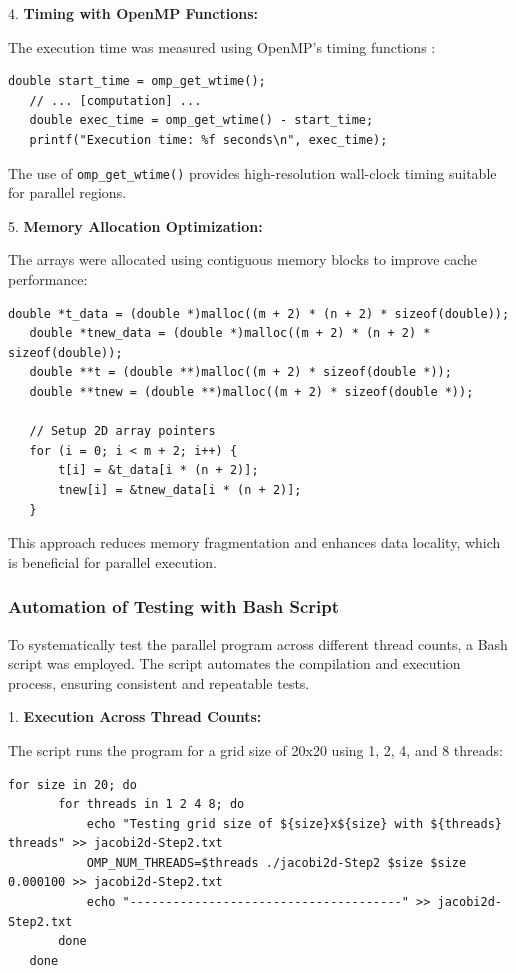 \documentclass{article}
\begin{document}
4. \textbf{Timing with OpenMP Functions:}

    The execution time was measured using OpenMP's timing functions \parencite{openmp}:

   \begin{lstlisting}[style=CStyle, caption={Timing with OpenMP Functions}]
   double start_time = omp_get_wtime();
   // ... [computation] ...
   double exec_time = omp_get_wtime() - start_time;
   printf("Execution time: %f seconds\n", exec_time);
   \end{lstlisting}

   The use of \texttt{omp\_get\_wtime()} provides high-resolution wall-clock timing suitable for parallel regions.

5. \textbf{Memory Allocation Optimization:}

   The arrays were allocated using contiguous memory blocks to improve cache performance:

   \begin{lstlisting}[style=CStyle, caption={Memory Allocation Optimization}]
   double *t_data = (double *)malloc((m + 2) * (n + 2) * sizeof(double));
   double *tnew_data = (double *)malloc((m + 2) * (n + 2) * sizeof(double));
   double **t = (double **)malloc((m + 2) * sizeof(double *));
   double **tnew = (double **)malloc((m + 2) * sizeof(double *));

   // Setup 2D array pointers
   for (i = 0; i < m + 2; i++) {
       t[i] = &t_data[i * (n + 2)];
       tnew[i] = &tnew_data[i * (n + 2)];
   }
   \end{lstlisting}

   This approach reduces memory fragmentation and enhances data locality, which is beneficial for parallel execution.

\subsubsection{Automation of Testing with Bash Script}

To systematically test the parallel program across different thread counts, a Bash script was employed. The script automates the compilation and execution process, ensuring consistent and repeatable tests.

1. \textbf{Execution Across Thread Counts:}

   The script runs the program for a grid size of 20x20 using 1, 2, 4, and 8 threads:

   \begin{lstlisting}[style=BashStyle, caption={}]
   for size in 20; do
       for threads in 1 2 4 8; do
           echo "Testing grid size of ${size}x${size} with ${threads} threads" >> jacobi2d-Step2.txt
           OMP_NUM_THREADS=$threads ./jacobi2d-Step2 $size $size 0.000100 >> jacobi2d-Step2.txt
           echo "--------------------------------------" >> jacobi2d-Step2.txt
       done
   done
   \end{lstlisting}
\end{document}
